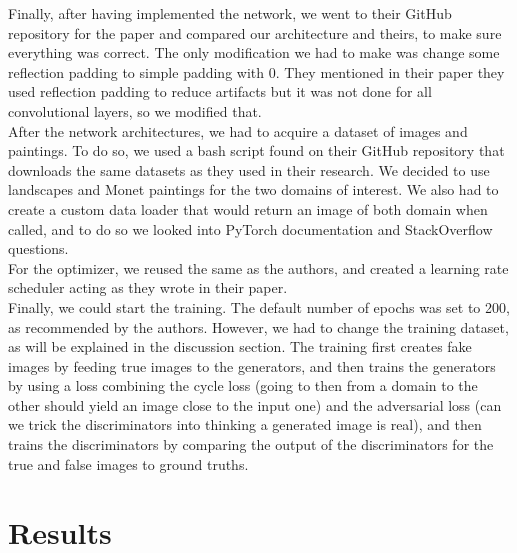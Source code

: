 \documentclass[twocolumn,superscriptaddress,aps, floatfix]{revtex4-1}
\begin{document}
    Finally, after having implemented the network, we went to their GitHub repository for the paper and compared our architecture and theirs, to make sure everything was correct. The only modification we had to make was change some reflection padding to simple padding with 0. They mentioned in their paper they used reflection padding to reduce artifacts but it was not done for all convolutional layers, so we modified that.\\
    
    After the network architectures, we had to acquire a dataset of images and paintings. To do so, we used a bash script found on their GitHub repository that downloads the same datasets as they used in their research. We decided to use landscapes and Monet paintings for the two domains of interest. We also had to create a custom data loader that would return an image of both domain when called, and to do so we looked into PyTorch documentation and StackOverflow questions.\\
    
    For the optimizer, we reused the same as the authors, and created a learning rate scheduler acting as they wrote in their paper.\\
    
    Finally, we could start the training. The default number of epochs was set to 200, as recommended by the authors. However, we had to change the training dataset, as will be explained in the discussion section. The training first creates fake images by feeding true images to the generators, and then trains the generators by using a loss combining the cycle loss (going to then from a domain to the other should yield an image close to the input one) and the adversarial loss (can we trick the discriminators into thinking a generated image is real), and then trains the discriminators by comparing the output of the discriminators for the true and false images to ground truths.
    
    
    
    
    \section{Results}
    
\end{document}

